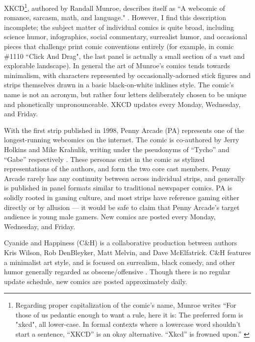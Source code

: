 \documentclass[man,12pt]{apa6}
\begin{document}
XKCD\footnote{Regarding proper capitalization of the comic's name, Munroe writes ``For those of us pedantic enough to want a rule, here it is: The preferred form is "xkcd", all lower-case. In formal contexts where a lowercase word shouldn't start a sentence, ``XKCD'' is an okay alternative. ``Xkcd'' is frowned upon.'' \cite{xkcd}}, authored by Randall Munroe, describes itself as ``A webcomic of romance, sarcasm, math, and language." \cite{xkcd}. However, I find this description incomplete; the subject matter of individual comics is quite broad, including science humor, infographics, social commentary, surrealist humor, and occasional pieces that challenge print comic conventions entirely (for example, in comic \#1110 ``Click And Drag", the last panel is actually a small section of a vast and explorable landscape). In general the art of Munroe's comics tends towards minimalism, with characters represented by occasionally-adorned stick figures and strips themselves drawn in a basic black-on-white inklines style. The comic's name is not an acronym, but rather four letters deliberately chosen to be unique and phonetically unpronounceable. XKCD updates every Monday, Wednesday, and Friday. 

With the first strip published in 1998, Penny Arcade (PA) represents one of the longest-running webcomics on the internet. The comic is co-authored by Jerry Holkins and Mike Krahulik, writing under the pseudonyms of ``Tycho'' and ``Gabe'' respectively \cite{pa}. These personas exist in the comic as stylized representations of the authors, and form the two core cast members. Penny Arcade rarely has any continuity between across individual strips, and generally is published in panel formats similar to traditional newspaper comics. PA is solidly rooted in gaming culture, and most strips have reference gaming either directly or by allusion --- it would be safe to claim that Penny Arcade's target audience is young male gamers. New comics are posted every Monday, Wednesday, and Friday. 

Cyanide and Happiness (C\&H) is a collaborative production between authors Kris Wilson, Rob DenBleyker, Matt Melvin, and Dave McElfatrick. C\&H features a minimalist art style, and is focused on surrealism, black comedy, and other humor generally regarded as obscene/offensive \cite{ch}. Though there is no regular update schedule, new comics are posted approximately daily. 
\end{document}
